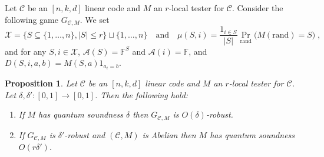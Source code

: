 \documentclass[11pt]{article}
\newtheorem{proposition}[theorem]{Proposition}
\theoremstyle{definition}
\newcommand{\code}{\mathcal{C}}
\newcommand{\field}{\mathbb{F}}
\newcommand{\mA}{\ensuremath{\mathcal{A}}}
\newcommand{\mC}{\ensuremath{\mathcal{C}}}
\newcommand{\mX}{\ensuremath{\mathcal{X}}}
\newcommand{\rand}{\textrm{rand}}
\begin{document}
Let $\code$ be an $[n,k,d]$ linear code and $M$ an $r$-local tester for $\code$. Consider the following game $G_{\code,M}$. We set 
\[\mX = \{ S\subseteq \{1,\ldots,n\},|S|\leq r\} \sqcup\{1,\ldots,n\}\quad\text{and}\quad \mu(S,i)=\frac{1_{i\in S}}{|S|}\Pr_\rand\big(M(\rand)=S\big)\;,\]
and for any $S,i\in\mX$, $\mA(S)=\field^S$ and $\mA(i)=\field$, and $D(S,i,a,b)=M(S,a)1_{a_i=b}$. 


\begin{proposition}\label{prop:sound-game}
Let $\code$ be an $[n,k,d]$ linear code and $M$ an $r$-local tester for $\code$. Let $\delta,\delta':[0,1]\to[0,1]$. Then the following hold:
\begin{enumerate}
\item If $M$ has quantum soundness $\delta$ then $G_{\code,M}$ is $O(\delta)$-robust.
\item If $G_{\code,M}$ is $\delta'$-robust and $(\mC,M)$ is Abelian then $M$ has quantum soundness $O(r\delta')$. 
\end{enumerate}
\end{proposition}
\end{document}
